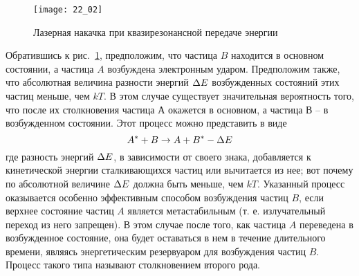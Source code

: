 \begin{figure}[h!]
    \center
    \texttt{[image: 22\_02]}
    \caption{Лазерная накачка при квазирезонансной передаче энергии}
    \label{img22.2}
\end{figure}

Обратившись к рис.~\ref{img22.2}, предположим, что частица \( B \) находится в 
основном состоянии, а частица \( A \) возбуждена электронным ударом. Предположим 
также, что абсолютная величина разности энергий \( \Delta E \) возбужденных 
состояний этих частиц меньше, чем \( kT \). В этом случае существует 
значительная вероятность того, что после их столкновения частица \( А \) 
окажется в основном, а частица \( В \) -- в возбужденном состоянии. Этот 
процесс можно представить в виде
\[
	A^{*} + B \rightarrow A + B^{*} - \Delta E
\]
где разность энергий \( \Delta E \), в зависимости от своего знака, добавляется к 
кинетической энергии сталкивающихся частиц или вычитается из нее; вот почему 
по абсолютной величине \( \Delta E \) должна быть меньше, чем \( kT \). Указанный
процесс оказывается особенно эффективным способом возбуждения частиц \( B \), 
если верхнее состояние частиц \( A \) является метастабильным (т. е. 
излучательный переход из него запрещен). В этом случае после того, как частица 
\( A \) переведена в возбужденное состояние, она будет оставаться в нем в 
течение длительного времени, являясь энергетическим резервуаром для 
возбуждения частиц \( B \). Процесс такого типа называют столкновением второго 
рода.
